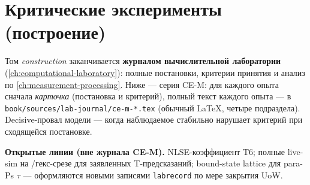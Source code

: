 \chapter{Критические эксперименты (построение)}
\label{ch:critical-construction}

Том \emph{construction} заканчивается \textbf{журналом вычислительной лаборатории}
(\cref{ch:computational-laboratory}): полные постановки, критерии принятия и анализ
по \cref{ch:measurement-processing}.
Ниже --- серия CE-M: для каждого опыта сначала \emph{карточка} (постановка и критерий),
полный текст каждого опыта --- в \texttt{book/sources/lab-journal/ce-m-*.tex} (обычный \LaTeX{}, четыре подраздела).
Decisive-провал модели --- когда наблюдаемое стабильно нарушает критерий при сходящейся постановке.



\medskip
\noindent\textbf{Открытые линии (вне журнала CE-M).}
NLSE-коэффициент T6; полные live-sim на \latGCKshort/гекс-срезе для заявленных T-предсказаний;
bound-state lattice для para-Ps $\tau$ --- оформляются новыми записями \texttt{labrecord} по мере закрытия UoW.
